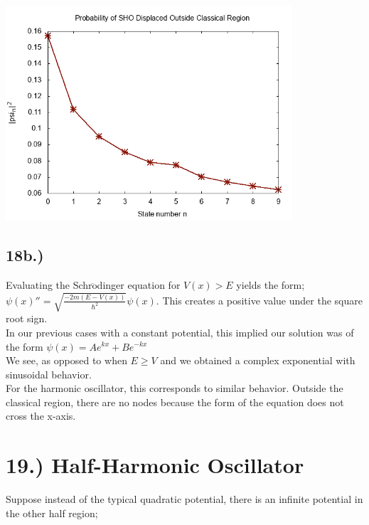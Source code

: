 \documentclass[12pt]{article}
\begin{document}
\linebreak
\begin{center}
\includegraphics[width=0.8\textwidth]{proba2.png}\\
\end{center}

\subsection*{18b.)}
Evaluating the Schr$\ddot{\text{o}}$dinger equation for $V(x)>E$ yields the form; \\

$\psi(x)''=\sqrt{\frac{-2m(E-V(x))}{\hbar^2}}\psi(x)$. This creates a positive value under the square root sign. \\

In our previous cases with a constant potential, this implied our solution was of the form $\psi(x)=Ae^{kx}+Be^{-kx}$ \\ 

We see, as opposed to when $E\geq V$ and we obtained a complex exponential with sinusoidal behavior.\\

For the harmonic oscillator, this corresponds to similar behavior. Outside the classical region, there are no nodes because the form of the equation does not cross the x-axis.\\
%
%
%
\section*{19.) Half-Harmonic Oscillator}
 Suppose instead of the typical quadratic potential, there is an infinite potential in the other half region;\\
\end{document}

